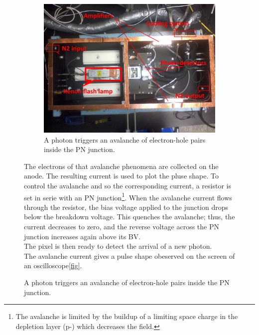 \documentclass[a4paper, 11pt]{report}%
\begin{document}
\begin{figure}[!hbtp]
  \centering
  \begin{figure}[!hbtp]  
    \includegraphics[totalheight=.35\textwidth,trim=0cm 7cm 0cm 2.5cm, clip=true,]{../Pictures/blabla/box.jpg}
    \caption{A photon triggers an avalanche of electron-hole pairs inside the PN junction.}
    \label{fig:avalanche}
  \end{figure}
  
  The electrons of that avalanche phenomena are collected on the anode. The resulting current is used to plot the  pluse shape. 
  To control the avalanche and so the corresponding current, a resistor is set in serie with an PN junction\footnote{The avalanche 
  is limited by the buildup of a limiting space charge in the depletion layer (p-) which decreases the field.}. 
  When the avalanche current flows through the resistor, the bias voltage applied to the junction drops below the breakdown voltage. 
  This quenches the avalanche; thus, the current decreases to zero, and the reverse voltage across the PN junction increases again above 
  its BV.
  \\
  
  The pixel is then ready to detect the arrival of a new photon.\\
  The avalanche current gives a pulse shape obeserved on the screen of an oscilloscope\ref{fig}.
  
  


\end{figure}
\end{document}
